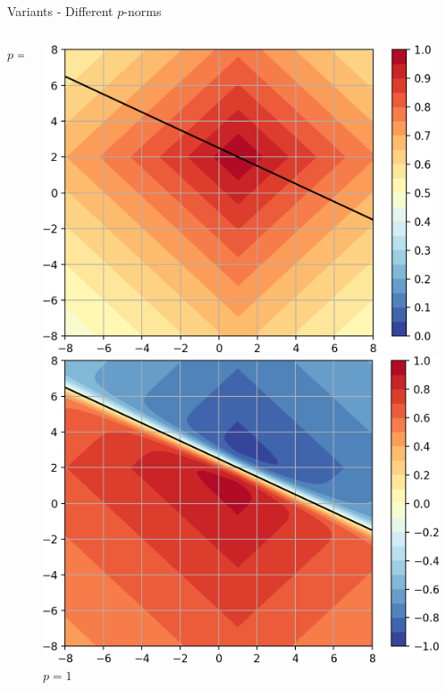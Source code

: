 \documentclass{beamer}
\begin{document}
\begin{frame}{Variants - Different $p$-norms}
\begin{minipage}{0.87\textwidth}
\begin{columns}
\begin{column}{.33\textwidth}
        \centering $p=0.5$
    \end{column}
    \begin{column}{.33\textwidth}
        \raggedright
        \includegraphics[width=0.98\textwidth]{images/Variants-Norms/ord1_g-cropped.png}\\
        \includegraphics[width=\textwidth]{images/Variants-Norms/ord1-cropped.png}\\
        \centering $p=1$
    \end{column} 
    \begin{column}{.33\textwidth}
        \raggedright

\end{column}
\end{columns}
\end{minipage}
\end{frame}
\end{document}
